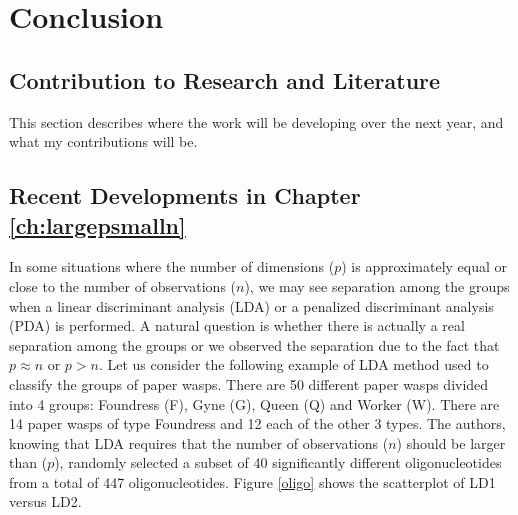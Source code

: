 
\chapter{Conclusion}\label{ch:conclusion}

\section{Contribution to Research and Literature} 

This section describes where the work will be developing over the next year, and what my contributions will be. 

\section{Recent Developments in Chapter \ref{ch:largepsmalln}}

In some situations where the number of dimensions ($p$) is approximately equal or close to the number of observations ($n$), we may see separation among the groups when a linear discriminant analysis (LDA) or a penalized discriminant analysis (PDA) is performed. A natural question is whether there is actually a real separation among the groups or we observed the separation due to the fact that $p \approx n$ or $p > n$. Let us consider the following example of LDA method used to classify the groups of paper wasps. There are 50 different paper wasps divided into 4 groups: Foundress (F), Gyne (G), Queen (Q) and Worker (W). There are 14 paper wasps of type Foundress and 12 each of the other 3 types. The authors, knowing that LDA requires that the number of observations ($n$) should be larger than ($p$), randomly selected a subset of 40 significantly different oligonucleotides from a total of 447 oligonucleotides. Figure \ref{oligo} shows the scatterplot of LD1 versus LD2.

